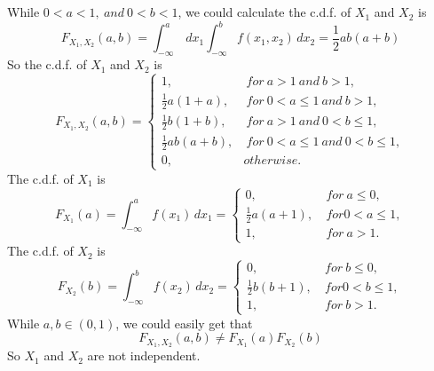 \documentclass[10.5pt]{article}
\begin{document}
\subsection{}
While $0<a<1,~and~ 0<b<1$, we could calculate the c.d.f. of $X_1$ and $X_2$ is $$F_{X_1,X_2}(a,b) = \int_{-\infty}^{a} \,dx_1 \int_{-\infty}^{b} f(x_1,x_2) \,dx_2 = \frac{1}{2}ab(a+b)$$\indent
So the c.d.f. of $X_1$ and $X_2$ is$$F_{X_1,X_2}(a,b) = \begin{cases}
    1,& ~for ~a> 1 ~and ~b> 1,\\
    \frac{1}{2}a(1+a),& ~for ~0<a\leqslant 1 ~and ~b>1,\\
    \frac{1}{2}b(1+b),& ~for ~a>1 ~and ~0<b\leqslant 1,\\
    \frac{1}{2}ab(a+b),& ~for ~0<a\leqslant 1 ~and ~0<b\leqslant 1,\\
    0,& otherwise.
\end{cases}$$\indent
The c.d.f. of $X_1$ is $$F_{X_1}(a) = \int_{-\infty}^{a} f(x_1) \,dx_1 = \begin{cases}
    0,& ~for ~a\leqslant 0,\\
    \frac{1}{2}a(a+1),& ~for 0<a\leqslant 1,\\
    1,& ~for ~a>1.
\end{cases}$$\indent
The c.d.f. of $X_2$ is $$F_{X_2}(b) = \int_{-\infty}^{b} f(x_2) \,dx_2 = \begin{cases}
    0,& ~for ~b\leqslant 0,\\
    \frac{1}{2}b(b+1),& ~for 0<b\leqslant 1,\\
    1,& ~for ~b>1.
\end{cases}$$\indent
While $a,b \in (0,1)$, we could easily get that $$F_{X_1,X_2}(a,b) \neq F_{X_1}(a)F_{X_2}(b)$$\indent
So $X_1$ and $X_2$ are not independent.

\section{}
\end{document}

